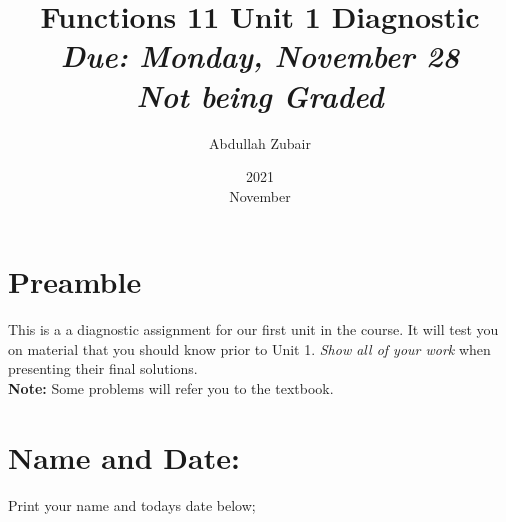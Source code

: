 \documentclass[12pt]{article} %
\title{\textbf{Functions 11 Unit 1 Diagnostic} \\ \emph{Due: Monday, November 28} \\ \emph{Not being Graded}}
\date{2021\\ November}
\author{Abdullah Zubair}
\begin{document}
    \renewcommand*{\coursecode}{Diagnostic} %
    \renewcommand*{\assgnnumber}{Unit 1} %
    \renewcommand*{\submdate}{November 22, 2021} %
    \renewcommand*{\studentfname}{Functions} %
    \renewcommand*{\studentlname}{11} %

    \renewcommand\qedsymbol{$\blacksquare$}
    \setfigpath
    \pagestyle{crowdmark}
    \fancyhfoffset[L,O]{0pt} %




	\maketitle \section{Preamble} This is a a diagnostic assignment for our first unit in the course. It will test you on material that
	you should know prior to Unit 1. \emph{Show all of your work} when presenting their final solutions.\\
	\textbf{Note:} Some problems will refer you to the textbook.
	 \section{Name and Date:} Print your name and todays date below;\\
\end{document}
